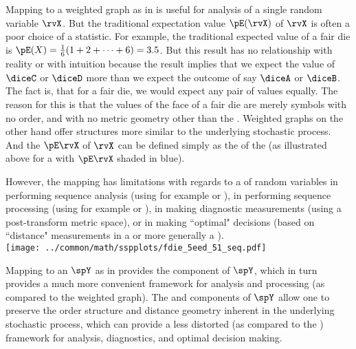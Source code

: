 Mapping to a weighted graph as in  
is useful for analysis of a single random variable $\rvX$.
But the traditional expectation value $\pE(\rvX)$ of $\rvX$ is often a poor choice of a statistic.
For example, the traditional expected value of a fair die is $\pE(X)=\frac{1}{6}(1+2+\cdots+6)=3.5$.
But this result has no relationship with reality or with intuition because the result implies that we expect 
the value of $\diceC$ or $\diceD$ more than we expect the outcome of say $\diceA$ or $\diceB$.
The fact is, that for a fair die, we would expect any pair of values equally.
The reason for this is that the values of the face of a fair die are merely symbols with no order, 
and with no metric geometry other than the .
Weighted graphs on the other hand offer structures more similar to the underlying stochastic process.
And the  $\pE\rvX$ 
of $\rvX$ can be defined simply as the  of the  %
(as illustrated above for a  with $\pE\rvX$ shaded in blue). %

However, the mapping has limitations with regards to a  of random variables in 
performing sequence analysis (using for example  or ),
in performing sequence processing (using for example  or ),
in making   diagnostic measurements (using a post-transform metric space),
or in making ``optimal" decisions 
(based on ``distance" measurements in a  or more generally a ).  %
\\\indentx\texttt{[image: ../common/math/sspplots/fdie\_5eed\_51\_seq.pdf]}

Mapping to an  $\spY$ as in 
provides the  component of $\spY$,
which in turn provides a much more convenient framework for  analysis and processing
(as compared to the weighted graph).
The  and  components of $\spY$ allow one to preserve the 
order structure and distance geometry inherent in the underlying %
stochastic process, which can provide a less distorted (as compared to the )
framework for analysis, diagnostics, and optimal decision making. %

